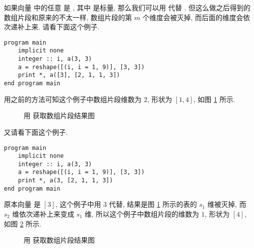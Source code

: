 如果向量  中的任意  是 \ttt{[im\_{}1]}, 其中 \ttt{[im\_{}1]} 是标量, 那么我们可以用  代替 \ttt{[im\_{}1]}. 但这么做之后得到的数组片段和原来的不太一样, 数组片段的第 $m$ 个维度会被灭掉, 而后面的维度会依次递补上来. 请看下面这个例子.
\begin{lstlisting}
program main
    implicit none
    integer :: i, a(3, 3)
    a = reshape([(i, i = 1, 9)], [3, 3])
    print *, a([3], [2, 1, 1, 3])
end program main
\end{lstlisting}
用之前的方法可知这个例子中数组片段维数为 $2$, 形状为 $[1, 4]$, 如图 \ref{a_section__example_1} 所示.
\begin{figure}[htbp]
    \centering
    \caption{用 \ttt{[im\_{}1]} 获取数组片段结果图}
    \label{a_section__example_1}
\end{figure}
又请看下面这个例子.
\begin{lstlisting}
program main
    implicit none
    integer :: i, a(3, 3)
    a = reshape([(i, i = 1, 9)], [3, 3])
    print *, a(3, [2, 1, 1, 3])
end program main
\end{lstlisting}
原本向量  是 $[3]$, 这个例子中用 $3$ 代替, 结果是图 \ref{a_section__example_1} 所示的表的 $s_1$ 维被灭掉, 而 $s_2$ 维依次递补上来变成 $s_1$ 维, 所以这个例子中数组片段的维数为 $1$, 形状为 $[4]$, 如图 \ref{a_section__example_2} 所示.
\begin{figure}[htbp]
    \centering
    \caption{用  获取数组片段结果图}
    \label{a_section__example_2}
\end{figure}

